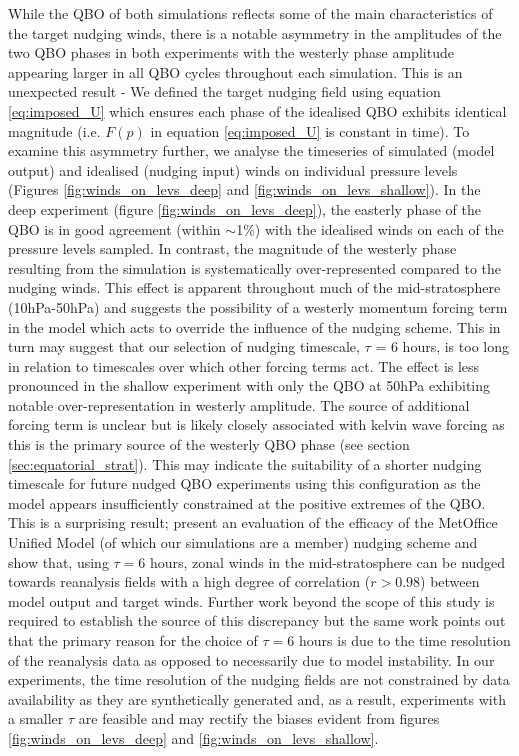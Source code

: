 While the QBO of both simulations reflects some of the main characteristics of the target nudging winds, there is a notable asymmetry in the amplitudes of the two QBO phases in both experiments with the westerly phase amplitude appearing larger in all QBO cycles throughout each simulation. This is an unexpected result - We defined the target nudging field using equation \ref{eq:imposed_U} which ensures each phase of the idealised QBO exhibits identical magnitude (i.e. $F(p)$ in equation \ref{eq:imposed_U} is constant in time). To examine this asymmetry further, we analyse the timeseries of simulated (model output) and idealised (nudging input) winds on individual pressure levels (Figures \ref{fig:winds_on_levs_deep} and \ref{fig:winds_on_levs_shallow}). In the deep experiment (figure \ref{fig:winds_on_levs_deep}), the easterly phase of the QBO is in good agreement (within $\sim$1\%) with the idealised winds on each of the pressure levels sampled. In contrast, the magnitude of the westerly phase resulting from the simulation is systematically over-represented compared to the nudging winds. This effect is apparent throughout much of the mid-stratosphere (10hPa-50hPa) and suggests the possibility of a westerly momentum forcing term in the model which acts to override the influence of the nudging scheme. This in turn may suggest that our selection of nudging timescale, $\tau$ = 6 hours, is too long in relation to timescales over which other forcing terms  act. The effect is less pronounced in the shallow experiment with only the QBO at 50hPa exhibiting notable over-representation in westerly amplitude. The source of additional forcing term is unclear but is likely closely associated with kelvin wave forcing as this is the primary source of the westerly QBO phase (see section \ref{sec:equatorial_strat}). This may indicate the suitability of a shorter nudging timescale for future nudged QBO experiments using this configuration as the model appears  insufficiently constrained at the positive extremes of the QBO. This is a surprising result; \cite{telfordTechnical2008} present an evaluation of the efficacy of the MetOffice Unified Model (of which our simulations are a member) nudging scheme and show that, using $\tau = 6$ hours, zonal winds in the mid-stratosphere can be nudged towards reanalysis fields with a high degree of correlation ($r>0.98$) between model output and target winds. Further work beyond the scope of this study is required to establish the source of this discrepancy but the same work points out that the primary reason for the choice of $\tau = 6$ hours is due to the time resolution of the reanalysis data as opposed to necessarily due to model instability. In our experiments, the time resolution of the nudging fields are not constrained by data availability as they are synthetically generated and, as a result, experiments with a smaller $\tau$ are feasible and may rectify the biases evident from figures \ref{fig:winds_on_levs_deep} and \ref{fig:winds_on_levs_shallow}.

